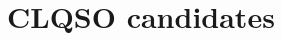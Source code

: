 \documentclass[twocolumn]{aastex62}
\begin{document}




\section{CLQSO candidates}
\label{app:clqso_cands}
\end{document}
